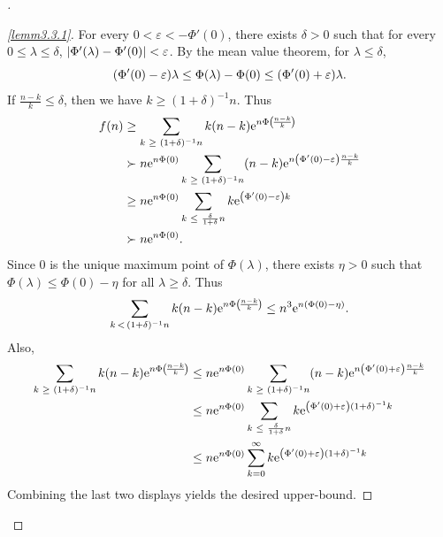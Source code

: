 \documentclass[10pt]{amsart}
\theoremstyle{definition}\newtheorem{defi}[theo]{Definition}\newtheorem{rema}[theo]{Remark}\newtheorem{exam}[theo]{Example}\newtheorem{exem}[theo]{Example}\newtheorem{nota}[theo]{Notation}
\newcommand{\rme}{\mathrm{e}}
\let\originalleft\left
\let\originalright\right
\renewcommand{\left}{\mathopen{}\mathclose\bgroup\originalleft}
\renewcommand{\right}{\aftergroup\egroup\originalright}
\let\oldge\ge
\renewcommand{\ge}{\mathchoice{\oldge}{\oldge}{\,\oldge\,}{\,\oldge\,}}
\let\oldle\le
\renewcommand{\le}{\mathchoice{\oldle}{\oldle}{\,\oldle\,}{\,\oldle\,}}
\newenvironment{proofc}[1][\proofname]{\begin{proof}[#1]}{\end{proof}}
\begin{document}
\begin{proofc}
\begin{proof}[{\eqref{lemm3.3.1}}]
For every $0 < \varepsilon < - \Phi'(0)$, there exists $\delta > 0$ such that for every $0 \leq \lambda \leq \delta$, $\left| \Phi'(\lambda) - \Phi'(0) \right| < \varepsilon$. By the mean value theorem, for $\lambda \leq \delta$,
\[
\left(\Phi'(0) - \varepsilon \right) \lambda \leq \Phi(\lambda) - \Phi(0) \leq \left(\Phi'(0) + \varepsilon \right) \lambda.
\]
If $\frac{n - k}{k} \leq \delta$, then we have $k \geq (1+\delta)^{-1}n$. Thus
\begin{align*}
f(n) &\geq \sum_{k \ge (1+\delta)^{-1} n} k (n - k) \rme^{n \Phi \left(\!\frac{n - k}{k}\!\right)} \\
&\succ n \rme^{n \Phi(0)} \sum_{k \ge (1+\delta)^{-1} n} (n - k) \rme^{n \left(\Phi'(0) - \varepsilon \right) \frac{n - k}{k}} \\
&\geq n \rme^{n \Phi(0)} \sum_{k \le \frac{\delta}{1 + \delta} n} k \rme^{\left(\Phi'(0) - \varepsilon \right) k} \\
&\succ  n \rme^{n \Phi(0)}.
\end{align*}
Since $0$ is the unique maximum point of $\Phi(\lambda)$, there exists $\eta > 0$ such that $\Phi(\lambda) \leq \Phi(0) - \eta$ for all $\lambda \geq \delta$. Thus
\[
\sum_{k\,<\,(1 + \delta)^{-1}n } k (n - k) \rme^{n \Phi \left(\!\frac{n - k}{k}\!\right)}
\leq n^3 \rme^{n \left(\Phi(0) - \eta \right)}.
\]
Also,
\begin{align*}
\sum_{k \ge (1 + \delta)^{-1} n} k (n - k) \rme^{n \Phi \left(\!\frac{n - k}{k}\!\right)}
&\leq n \rme^{n \Phi(0)} \sum_{k \ge (1 + \delta)^{-1} n} (n - k) \rme^{n \left(\Phi'(0) + \varepsilon \right) \frac{n - k}{k}} \\
&\leq n \rme^{n \Phi(0)} \sum_{k \le \frac{\delta}{1 + \delta}n} k \rme^{\left(\Phi'(0) + \varepsilon \right) (1 + \delta)^{-1} k} \\
&\leq n \rme^{n \Phi(0)} \sum_{k = 0}^{\infty} k \rme^{\left(\Phi'(0) + \varepsilon \right) (1 + \delta)^{-1} k}
\end{align*}
Combining the last two displays yields the desired upper-bound.
\let\qed\relax
\end{proof}


\end{proofc}
\end{document}
